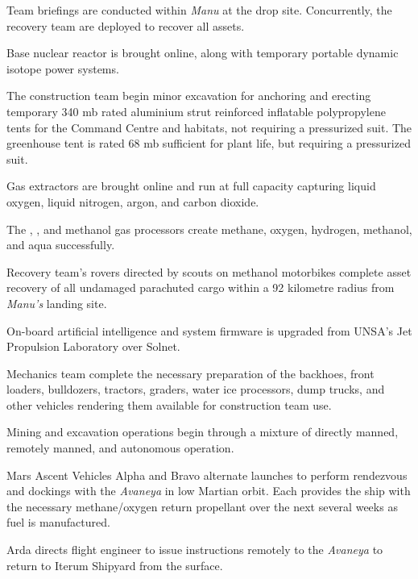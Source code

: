 Team briefings are conducted within {\it Manu} at the drop site. Concurrently, the recovery team are deployed to recover all assets.

Base nuclear reactor is brought online, along with temporary portable dynamic isotope power systems.

The construction team begin minor excavation for anchoring and erecting temporary 340 mb rated aluminium strut reinforced inflatable polypropylene tents for the Command Centre and habitats, not requiring a pressurized suit. The greenhouse tent is rated 68 mb sufficient for plant life, but requiring a pressurized suit.
\StopTimelineDate

Gas extractors are brought online and run at full capacity capturing liquid oxygen, liquid nitrogen, argon, and carbon dioxide. 

The , , and methanol gas processors create methane, oxygen, hydrogen, methanol, and aqua successfully.
\StopTimelineDate

Recovery team's rovers directed by scouts on methanol motorbikes complete asset recovery of all undamaged parachuted cargo within a 92 kilometre radius from {\it Manu's} landing site.
\StopTimelineDate

On-board artificial intelligence and system firmware is upgraded from UNSA's Jet Propulsion Laboratory over Solnet.

Mechanics team complete the necessary preparation of the backhoes, front loaders, bulldozers, tractors, graders, water ice processors, dump trucks, and other vehicles rendering them available for construction team use.

Mining and excavation operations begin through a mixture of directly manned, remotely manned, and autonomous operation.
\StopTimelineDate

Mars Ascent Vehicles Alpha and Bravo alternate launches to perform rendezvous and dockings with the {\it Avaneya} in low Martian orbit. Each provides the ship with the necessary methane/oxygen return propellant over the next several weeks as fuel is manufactured.
\StopTimelineDate

Arda directs flight engineer to issue instructions remotely to the {\it Avaneya} to return to Iterum Shipyard from the surface.
\StopTimelineDate

